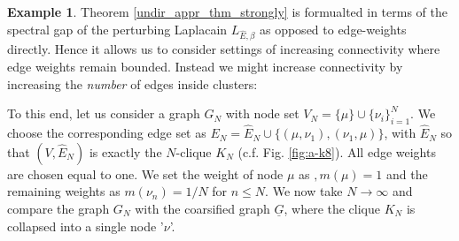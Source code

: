 \documentclass[reqno,12pt,letterpaper]{amsart}
\numberwithin{equation}{section}
\newcommand{\1}{\mathds{1}}
\theoremstyle{definition}
\newtheorem{Ex}[Th]{Example}
\begin{document}
\begin{Ex}\label{clique_connectivity_example}
	  Theorem \ref{undir_appr_thm_strongly} is formualted in terms of the spectral gap of the perturbing Laplacain $L_{\hat{E},\beta}$ as opposed to edge-weights directly. Hence it allows us to consider settings of increasing connectivity where edge weights remain bounded. Instead we might increase connectivity by increasing the \emph{number} of edges inside clusters:
	 
\noindent	\begin{minipage}[b]{0.55\textwidth}
\noindent To this end, let us consider a graph $G_{N}$ with node set $V_N = \{\mu\} \cup \{\nu_i\}_{i = 1}^N$. We choose the corresponding edge set as $E_N = \hat{E}_N \cup \{(\mu,\nu_1), (\nu_1,\mu)\}$, with $\hat{E}_N$  so that $(V, \hat{E}_N)$ is exactly the $N$-clique $K_N$ (c.f. Fig. \ref{fig:a-k8}). All edge weights are chosen equal to one. We set the weight of node $\mu$ as $,m(\mu) = 1$ and the remaining weights as $m(\nu_n) = 1/N$ for $n \leq N$.  We now take $N \rightarrow \infty$ and compare the graph $G_N$ with the coarsified graph $\underline{G}$, where the clique $K_N$ is collapsed into a single node '$\nu$'. 
\end{minipage}
	\begin{minipage}[b]{0.5\textwidth}
	\centering
{}
\end{minipage}
\end{Ex}
\end{document}
